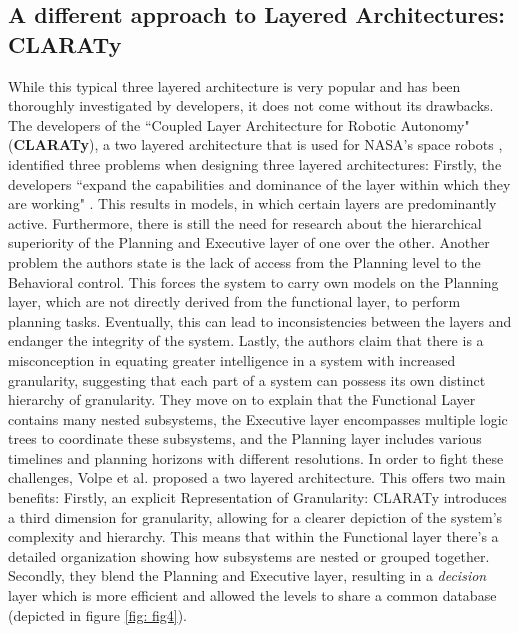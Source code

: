 \documentclass[%
paper=A4,               %
twoside=true,           %
openright,              %
11pt,                   %
bibliography=totoc,     %
titlepage=on,           %
DIV=12,                 %
BCOR=1.5cm,             %
parskip=half,            %
final
]{scrreprt}
\begin{document}
	\subsection{A different approach to Layered Architectures: CLARATy}
	\label{subsec:CLARATY}
	While this typical three layered architecture is very popular and has been thoroughly investigated by developers, it does not come without its drawbacks. The developers of the ``Coupled Layer Architecture for Robotic Autonomy" (\textbf{CLARATy}), a two layered architecture that is used for NASA's space robots \autocite{sicilianoSpringerHandbookRobotics2016}, identified three problems when designing three layered architectures:
	Firstly, the developers ``expand the capabilities and dominance of the layer within which they are working" \autocite{volpeCLARAtyArchitectureRobotic2001}. This results in models, in which certain layers are predominantly active. Furthermore, there is still the need for research about the hierarchical superiority of the Planning and Executive layer of one over the other. \autocite{volpeCLARAtyArchitectureRobotic2001} Another problem the authors state is the lack of access from the Planning level to the Behavioral control. This forces the system to carry own models on the Planning layer, which are not directly derived from the functional layer, to perform planning tasks. Eventually, this can lead to inconsistencies between the layers and endanger the integrity of the system. \autocite{volpeCLARAtyArchitectureRobotic2001} Lastly, the authors claim that there is a misconception in equating greater intelligence in a system with increased granularity, suggesting that each part of a system can possess its own distinct hierarchy of granularity. They move on to explain that the Functional Layer contains many nested subsystems, the Executive layer encompasses multiple logic trees to coordinate these subsystems, and the Planning layer includes various timelines and planning horizons with different resolutions. \autocite{volpeCLARAtyArchitectureRobotic2001}
	In order to fight these challenges, Volpe et al. proposed a two layered architecture. This offers two main benefits: \newline
	Firstly, an explicit Representation of Granularity: CLARATy introduces a third dimension for granularity, allowing for a clearer depiction of the system's complexity and hierarchy. This means that within the Functional layer there's a detailed organization showing how subsystems are nested or grouped together. Secondly, they blend the Planning and Executive layer, resulting in a \textit{decision} layer which is more efficient and allowed the levels to share a common database (depicted in figure \ref{fig: fig4}). \autocite{volpeCLARAtyArchitectureRobotic2001} 
	
\end{document}
